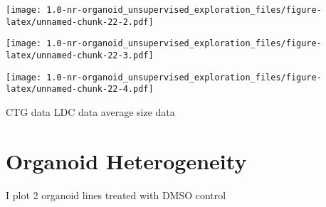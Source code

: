 \documentclass[
]{article}
\newenvironment{Shaded}{\begin{snugshade}}{\end{snugshade}}
\newcommand{\DataTypeTok}[1]{\textcolor[rgb]{0.13,0.29,0.53}{#1}}
\newcommand{\FloatTok}[1]{\textcolor[rgb]{0.00,0.00,0.81}{#1}}
\newcommand{\KeywordTok}[1]{\textcolor[rgb]{0.13,0.29,0.53}{\textbf{#1}}}
\newcommand{\NormalTok}[1]{#1}
\newcommand{\OperatorTok}[1]{\textcolor[rgb]{0.81,0.36,0.00}{\textbf{#1}}}
\newcommand{\StringTok}[1]{\textcolor[rgb]{0.31,0.60,0.02}{#1}}
\begin{document}
\texttt{[image: 1.0-nr-organoid\_unsupervised\_exploration\_files/figure-latex/unnamed-chunk-22-2.pdf]}

\begin{Shaded}
\end{Shaded}

\texttt{[image: 1.0-nr-organoid\_unsupervised\_exploration\_files/figure-latex/unnamed-chunk-22-3.pdf]}

\begin{Shaded}
\end{Shaded}

\texttt{[image: 1.0-nr-organoid\_unsupervised\_exploration\_files/figure-latex/unnamed-chunk-22-4.pdf]}

CTG data LDC data average size data

\hypertarget{organoid-heterogeneity}{%
\section{Organoid Heterogeneity}\label{organoid-heterogeneity}}

I plot 2 organoid lines treated with DMSO control
\end{document}

